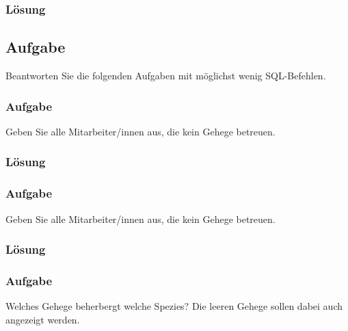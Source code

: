 \subsubsection*{Lösung}
\label{subsubsec:uebung_01.aufgabe_9.loesung}


\subsection{Aufgabe}
\label{subsec:uebung_01.aufgabe_10}
Beantworten Sie die folgenden Aufgaben mit möglichst wenig SQL-Befehlen.

\subsubsection{Aufgabe}
\label{subsec:uebung_01.aufgabe_10a}
Geben Sie alle Mitarbeiter/innen aus, die kein Gehege betreuen.

\subsubsection*{Lösung}
\label{subsubsec:uebung_01.aufgabe_10a.loesung}

\subsubsection{Aufgabe}
\label{subsec:uebung_01.aufgabe_10b}
Geben Sie alle Mitarbeiter/innen aus, die kein Gehege betreuen.

\subsubsection*{Lösung}
\label{subsubsec:uebung_01.aufgabe_10b.loesung}

\subsubsection{Aufgabe}
\label{subsec:uebung_01.aufgabe_10c}
Welches Gehege beherbergt welche Spezies? Die leeren Gehege sollen dabei auch angezeigt werden.

